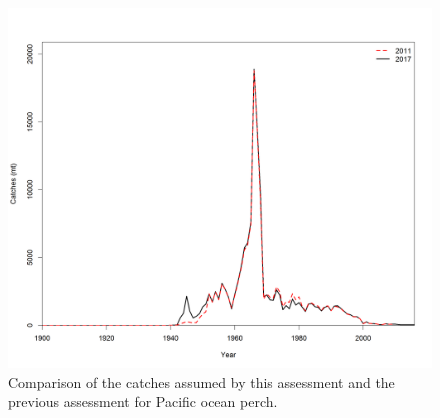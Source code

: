 \documentclass[12pt,]{article}
\begin{document}
\begin{figure}
\centering
\includegraphics{Figures/Catch_Comparison.png}
\caption{Comparison of the catches assumed by this assessment and the
previous assessment for Pacific ocean perch. \label{fig:Catch_Compare}}
\end{figure}

\FloatBarrier 
\end{document}
